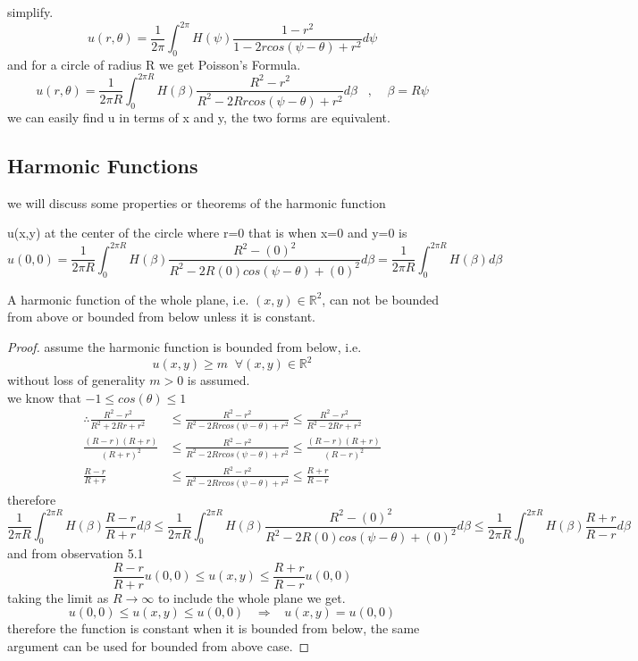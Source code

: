 \documentclass[]{article}
\begin{document}
simplify.
\[
    u(r,\theta) = \frac{1}{2\pi}\int_{0}^{2\pi} H(\psi )\frac{1-r^2}{1-2rcos(\psi  -\theta)+r^2}d\psi     
\]
and for a circle of radius R we get Poisson's Formula.
\[
    u(r,\theta) = \frac{1}{2\pi R}\int_{0}^{2\pi R} H(\beta)\frac{R^2-r^2}{R^2-2Rrcos(\psi  -\theta)+r^2}d\beta \;\;\;, \;\;\;\; \beta = R\psi     
\]
we can easily find u in terms of x and y, the two forms are equivalent.

\subsection{Harmonic Functions}
we will discuss some properties or theorems of the harmonic function

\begin{observation}
    u(x,y) at the center of the circle where r=0 that is when x=0 and y=0 is
    \[
        u(0,0) = \frac{1}{2\pi R}\int_{0}^{2\pi R} H(\beta)\frac{R^2-(0)^2}{R^2-2R(0)cos(\psi  -\theta)+(0)^2}d\beta =\frac{1}{2\pi R}\int_{0}^{2\pi R} H(\beta)d\beta     
    \]
\end{observation}    

\begin{theorem}
    A harmonic function of the whole plane, i.e. $(x,y) \in \mathbb{R}^2$, can not be bounded from above or bounded from below unless it is constant.    
\end{theorem}
\begin{proof}
    assume the harmonic function is bounded from below, i.e.    
    \[
        u(x,y) \geq m \;\; \forall (x,y) \in \mathbb{R}^2     
    \]
    without loss of generality $m > 0$ is assumed.
    \\
    we know that $ -1 \leq cos(\theta) \leq 1$
    \begin{align*}
        \therefore
        \frac{R^2-r^2}{R^2+2Rr+r^2} &\leq \frac{R^2-r^2}{R^2-2Rrcos(\psi  -\theta)+r^2} \leq \frac{R^2-r^2}{R^2-2Rr+r^2}
        \\
        \frac{(R-r)(R+r)}{{(R+r)}^2} &\leq \frac{R^2-r^2}{R^2-2Rrcos(\psi  -\theta)+r^2} \leq \frac{(R-r)(R+r)}{{(R-r)}^2}
        \\
        \frac{R-r}{R+r} &\leq \frac{R^2-r^2}{R^2-2Rrcos(\psi  -\theta)+r^2} \leq \frac{R+r}{R-r}
    \end{align*}
    therefore
    \[
        \frac{1}{2\pi R}\int_{0}^{2\pi R} H(\beta)\frac{R-r}{R+r} d\beta \leq \frac{1}{2\pi R}\int_{0}^{2\pi R} H(\beta)\frac{R^2-(0)^2}{R^2-2R(0)cos(\psi  -\theta)+(0)^2}d\beta \leq \frac{1}{2\pi R}\int_{0}^{2\pi R} H(\beta)\frac{R+r}{R-r} d\beta    
    \]
    and from observation 5.1 
    \[
        \frac{R-r}{R+r} u(0,0) \leq u(x,y) \leq \frac{R+r}{R-r} u(0,0)    
    \]
    taking the limit as $R \to \infty$ to include the whole plane we get.
    \[
        u(0,0) \leq u(x,y) \leq u(0,0) \;\;\; \Rightarrow \;\;\; u(x,y) = u(0,0)    
    \]
    therefore the function is constant when it is bounded from below, the same argument can be used for bounded from above case.
\end{proof}
\end{document}
